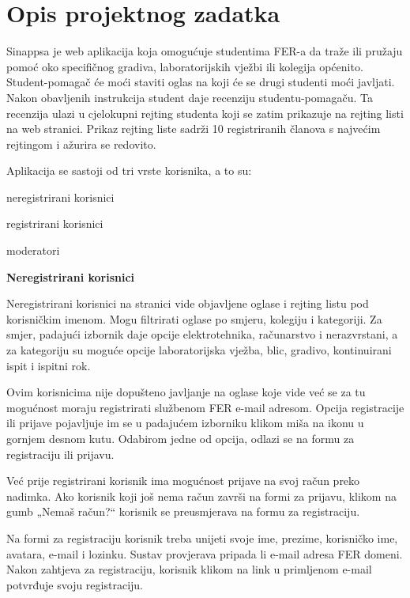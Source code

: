 \chapter{Opis projektnog zadatka}

			Sinappsa je web aplikacija koja omogućuje studentima FER-a da traže ili pružaju pomoć oko specifičnog gradiva, laboratorijskih vježbi ili kolegija općenito. Student-pomagač će moći staviti oglas na koji će se drugi studenti moći javljati. Nakon obavljenih instrukcija student daje recenziju studentu-pomagaču. Ta recenzija ulazi u cjelokupni rejting studenta koji se zatim prikazuje na rejting listi na web stranici. Prikaz rejting liste sadrži 10 registriranih članova s najvećim rejtingom i ažurira se redovito.
			
			Aplikacija se sastoji od tri vrste korisnika, a to su:
			\begin{packed_enum}
				\item neregistrirani korisnici
				\item registrirani korisnici 
				\item moderatori
			\end{packed_enum}
		
	\noindent \textbf{Neregistrirani korisnici}
	
			Neregistrirani korisnici na stranici vide objavljene oglase i rejting listu pod korisničkim imenom. Mogu filtrirati oglase po smjeru, kolegiju i kategoriji. Za smjer, padajući izbornik daje opcije elektrotehnika, računarstvo i nerazvrstani, a za kategoriju su moguće opcije laboratorijska vježba, blic, gradivo, kontinuirani ispit i ispitni rok.
			
			Ovim korisnicima nije dopušteno javljanje na oglase koje vide već se za tu mogućnost moraju registrirati službenom FER e-mail adresom. Opcija registracije ili prijave pojavljuje im se u padajućem izborniku klikom miša na ikonu u gornjem desnom kutu. Odabirom jedne od opcija, odlazi se na formu za registraciju ili prijavu.
			
			Već prije registrirani korisnik ima mogućnost prijave na svoj račun preko nadimka. Ako korisnik koji još nema račun završi na formi za prijavu, klikom na gumb „Nemaš račun?“ korisnik se preusmjerava na formu za registraciju. 
			
			Na formi za registraciju korisnik treba unijeti svoje ime, prezime, korisničko ime, avatara, e-mail i lozinku. Sustav provjerava pripada li e-mail adresa FER domeni. Nakon zahtjeva za registraciju, korisnik klikom na link u primljenom e-mail potvrđuje svoju registraciju.
			
